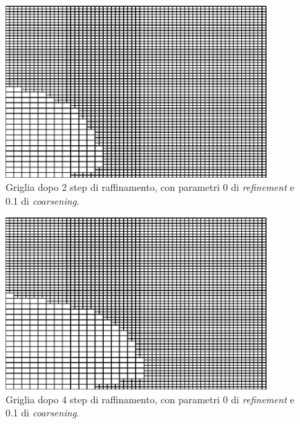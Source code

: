 \documentclass[a4paper,10pt]{report}
\theoremstyle{plain}
\theoremstyle{definition}
\theoremstyle{remark}
\begin{document}
\begin{figure}[htp!]
\begin{center}
\includegraphics[width=10cm]{img/meshes/LogPrice2.eps}
\caption{Griglia dopo 2 step di raffinamento, con parametri 0 di \emph{refinement} e 0.1 di \emph{coarsening}.}
\label{fig:test5-logprice2}
\end{center}
\end{figure}
\begin{figure}[htp!]
\begin{center}
\includegraphics[width=10cm]{img/meshes/LogPrice3.eps}
\caption{Griglia dopo 4 step di raffinamento, con parametri 0 di \emph{refinement} e 0.1 di \emph{coarsening}.}
\label{fig:test5-logprice3}
\end{center}
\end{figure}
\end{document}
